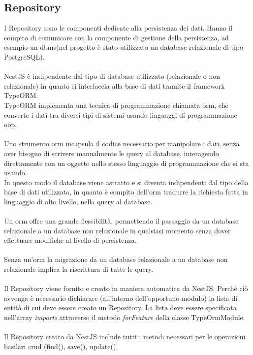 \subsection{Repository}
I Repository sono le componenti dedicate alla persistenza dei dati. Hanno il compito di
comunicare con la componente di gestione della persistenza, ad esempio un \gls{dbms}\glsfirstoccur (nel progetto è stato 
utilizzato un database
relazionale di tipo PostgreSQL).
\\\\
NestJS è indipendente dal tipo di database utilizzato (relazionale o non relazionale) in quanto si interfaccia
alla base di dati tramite il framework TypeORM. 
\\
TypeORM implementa una tecnica di programmazione chiamata 
\gls{orm}\glsfirstoccur, che converte i dati tra diversi tipi di sistemi usando linguaggi di programmazione \gls{oop}\glsfirstoccur.
\\\\
Uno strumento \gls{orm} incapsula il codice necessario per manipolare i dati, senza aver bisogno di scrivere manualmente
le query al database, interagendo direttamente con un oggetto nello stesso linguaggio di programmazione che si sta usando. 
\\
In questo modo il database viene astratto e si diventa indipendenti dal tipo della base di dati utilizzata, in quanto è compito dell'\gls{orm}
tradurre la richiesta fatta in linguaggio di alto livello, nella query al database. 
\\\\
Un \gls{orm} offre una grande flessibilità, permettendo il passaggio da un database
relazionale a un database non relazionale in qualsiasi momento senza dover effettuare modifiche al livello di persistenza.
\\\\
Senza un'\gls{orm} la migrazione da un database relazionale a un database non relazionale implica la riscrittura di tutte le query.
\\\\
Il Repository viene fornito e creato in maniera automatica da NestJS. Perché ciò avvenga è necessario
dichiarare (all'interno dell'opportuno modulo) la lista di entità di cui deve essere creato un Repository.
La lista deve essere specificata nell'array \textit{imports} attraverso 
il metodo \textit{forFeature} della classe TypeOrmModule.
\\\\
Il Repository creato da NestJS include tutti i metodi necessari per le operazioni basilari \gls{crud} (find(), save(), update(), 
